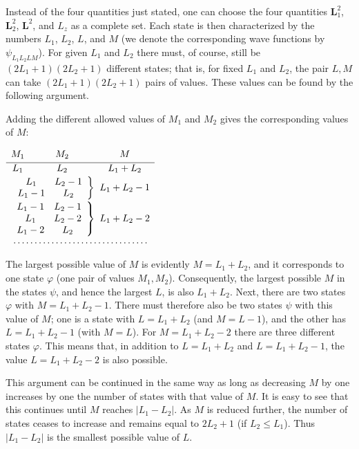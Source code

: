Instead of the four quantities just stated, one can choose the four quantities
$\mathbf L_1^2$, $\mathbf L_2^2$, $\mathbf L^2$, and $L_z$ as a complete
set. Each state is then characterized by the numbers $L_1$, $L_2$, $L$, and
$M$ (we denote the corresponding wave functions by $\psi_{L_1L_2LM}$).
For given $L_1$ and $L_2$ there must, of course, still be
$(2L_1+1)(2L_2+1)$ different states; that is, for fixed $L_1$ and $L_2$, the
pair $L,M$ can take $(2L_1+1)(2L_2+1)$ pairs of values. These values can be
found by the following argument.

Adding the different allowed values of $M_1$ and $M_2$ gives the corresponding
values of $M$:
\begin{flushleft}
\(
\begin{array}{c@{\qquad}c@{\qquad}c}
 M_1 & M_2 & M\\[2pt]
 \hline
 L_1 & L_2 & L_1+L_2\\[2pt]
 \multicolumn{2}{c}{
   \left.\begin{array}{cc}L_1&L_2-1\\L_1-1&L_2\end{array}\right\}}
 &L_1+L_2-1\\[8pt]
 \multicolumn{2}{c}{
   \left.\begin{array}{cc}L_1-1&L_2-1\\L_1&L_2-2\\L_1-2&L_2\end{array}\right\}}
 &L_1+L_2-2\\[-1pt]
 \multicolumn{3}{c}{\dotfill}
\end{array}
\)
\end{flushleft}
The largest possible value of $M$ is evidently $M=L_1+L_2$, and it
corresponds to one state $\varphi$ (one pair of values $M_1,M_2$).
Consequently, the largest possible $M$ in the states $\psi$, and hence the
largest $L$, is also $L_1+L_2$. Next, there are two states $\varphi$ with
$M=L_1+L_2-1$. There must therefore also be two states $\psi$ with this value
of $M$; one
is a state with $L=L_1+L_2$ (and $M=L-1$), and the other has
$L=L_1+L_2-1$ (with $M=L$). For $M=L_1+L_2-2$ there are three different
states $\varphi$. This means that, in addition to $L=L_1+L_2$ and
$L=L_1+L_2-1$, the value $L=L_1+L_2-2$ is also possible.

This argument can be continued in the same way as long as decreasing $M$ by
one increases by one the number of states with that value of $M$. It is easy
to see that this continues until $M$ reaches $|L_1-L_2|$. As $M$ is reduced
further, the number of states ceases to increase and remains equal to
$2L_2+1$ (if $L_2\leq L_1$). Thus $|L_1-L_2|$ is the smallest possible
value of $L$.

